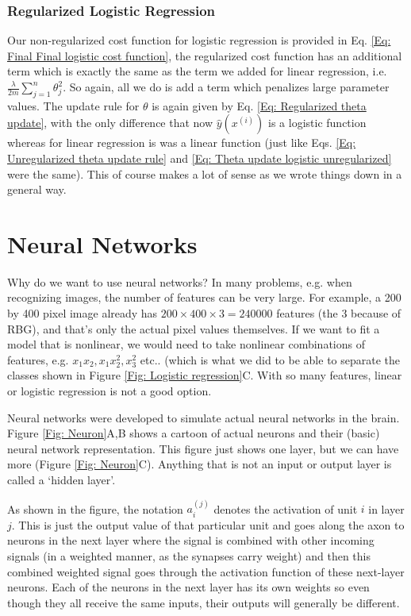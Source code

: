 \documentclass[a4paper, 10pt,hidelinks]{article}
\newcommand{\ind}[1]{^{(#1)}}
\begin{document}
 
\subsubsection{Regularized Logistic Regression}

Our non-regularized cost function for logistic regression is provided in Eq. \eqref{Eq: Final Final logistic cost function}, the regularized cost function has an additional term which is exactly the same as the term we added for linear regression, i.e. $\frac{\lambda}{2 m} \sum_{j = 1}^n \theta_j^2$. So again, all we do is add a term which penalizes large parameter values. The update rule for $\theta$ is again given by Eq. \eqref{Eq: Regularized theta update}, with the only difference that now $\hat{y}(x\ind{i})$ is a logistic function whereas for linear regression is was a linear function (just like Eqs. \eqref{Eq: Unregularized theta update rule} and \eqref{Eq: Theta update logistic unregularized} were the same). This of course makes a lot of sense as we wrote things down in a general way.

\section{Neural Networks}
Why do we want to use neural networks? In many problems, e.g. when recognizing images, the number of features can be very large. For example, a 200 by 400 pixel image already has $200 \times 400 \times 3 = 240000$ features (the 3 because of RBG), and that's only the actual pixel values themselves. If we want to fit a model that is nonlinear, we would need to take nonlinear combinations of features, e.g. $x_1 x_2, x_1 x_2^2, x_3^2$ etc.. (which is what we did to be able to separate the classes shown in Figure \ref{Fig: Logistic regression}C. With so many features, linear or logistic regression is not a good option. 

Neural networks were developed to simulate actual neural networks in the brain. Figure \ref{Fig: Neuron}A,B shows a cartoon of actual neurons and their (basic) neural network representation. This figure just shows one layer, but we can have more (Figure \ref{Fig: Neuron}C). Anything that is not an input or output layer is called a `hidden layer'.

As shown in the figure, the notation $a\ind{j}_i$ denotes the activation of unit $i$ in layer $j$. This is just the output value of that particular unit and goes along the axon to neurons in the next layer where the signal is combined with other incoming signals (in a weighted manner, as the synapses carry weight) and then this combined weighted signal goes through the activation function of these next-layer neurons. Each of the neurons in the next layer has its own weights so even though they all receive the same inputs, their outputs will generally be different. 
\end{document}
